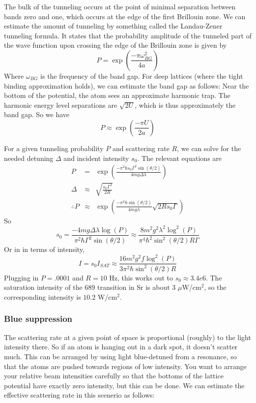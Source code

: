 \documentclass[aps,twocolumn,prb,floatfix,amsmath,amssymb,groupedaddress]{revtex4}
\begin{document}
The bulk of the tunneling occurs at the point of minimal separation between bands zero and one, which occurs at the edge of the first Brillouin zone.  We can estimate the amount of tunneling by something called the Landau-Zener tunneling formula.  It states that the probability amplitude of the tunneled part of the wave function upon crossing the edge of the Brillouin zone is given by \[P = \exp\left(\frac{-\pi \omega_{BG}^2}{4a}\right)\]
Where $\omega_{BG}$ is the frequency of the band gap.  For deep lattices (where the tight binding approximation holds), we can estimate the band gap as follows:  Near the bottom of the potential, the atom sees an approximate harmonic trap.  The harmonic energy level separations are $\sqrt{2U}$, which is thus approximately the band gap.  So we have 
\begin{equation}
P\approx \exp\left(\frac{-\pi U}{2a}\right)
\label{tunneling}
\end{equation}

For a given tunneling probability $P$ and scattering rate $R$, we can solve for the needed detuning $\Delta$ and incident intensity $s_0$.  The relevant equations are 
\begin{eqnarray*}
P & = & \exp\left(\frac{-\pi^2 \hbar s_0 \Gamma^2 \sin(\theta/2)}{4mg\Delta\lambda}\right)\\
\Delta & \approx & \sqrt{\frac{s_0 \Gamma^3}{2R}} \\
\therefore P & \approx & \exp\left(\frac{-\pi^2\hbar\sin(\theta/2)}{4mg\lambda}\sqrt{2Rs_0\Gamma}\right) 
\end{eqnarray*}
So \[s_0 = \frac{-4mg\Delta\lambda\log(P)}{\pi^2\hbar\Gamma^2\sin(\theta/2)} \approx \frac{8m^2g^2\lambda^2\log^2(P)}{\pi^4\hbar^2\sin^2(\theta/2)R\Gamma}\]
Or in in terms of intensity, \[I  = s_0 I_{SAT} \approx \frac{16 m^2g^2 f \log^2(P)}{3\pi^2\hbar\sin^2(\theta/2)R}\]
Plugging in $P=.0001$ and $R=10$ Hz, this works out to $s_0\approx 3.4e6$.  The saturation intensity of the 689 transition in Sr is about 3 $\mu$W/cm$^2$, so the corresponding intensity is $10.2$ W/cm$^2$.

\subsubsection{Blue suppression}
The scattering rate at a given point of space is proportional (roughly) to the light intensity there.  So if an atom is hanging out in a dark spot, it doesn't scatter much.  This can be arranged by using light blue-detuned from a resonance, so that the atoms are pushed towards regions of low intensity.  You want to arrange your relative beam intensities carefully so that the bottoms of the lattice potential have exactly zero intensity, but this can be done.  We can estimate the effective scattering rate in this scenerio as follows:
\end{document}
